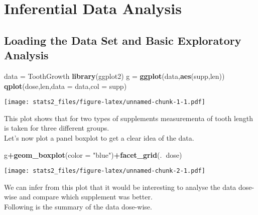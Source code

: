 \documentclass[
]{article}
\author{}
\date{\vspace{-2.5em}}
\newenvironment{Shaded}{\begin{snugshade}}{\end{snugshade}}
\newcommand{\ControlFlowTok}[1]{\textcolor[rgb]{0.13,0.29,0.53}{\textbf{#1}}}
\newcommand{\DataTypeTok}[1]{\textcolor[rgb]{0.13,0.29,0.53}{#1}}
\newcommand{\KeywordTok}[1]{\textcolor[rgb]{0.13,0.29,0.53}{\textbf{#1}}}
\newcommand{\NormalTok}[1]{#1}
\newcommand{\OperatorTok}[1]{\textcolor[rgb]{0.81,0.36,0.00}{\textbf{#1}}}
\newcommand{\StringTok}[1]{\textcolor[rgb]{0.31,0.60,0.02}{#1}}
\begin{document}
\hypertarget{inferential-data-analysis}{%
\section{Inferential Data Analysis}\label{inferential-data-analysis}}

\hypertarget{loading-the-data-set-and-basic-exploratory-analysis}{%
\subsection{Loading the Data Set and Basic Exploratory
Analysis}\label{loading-the-data-set-and-basic-exploratory-analysis}}

\begin{Shaded}
\begin{Highlighting}[]
\NormalTok{data =}\StringTok{ }\NormalTok{ToothGrowth}
\KeywordTok{library}\NormalTok{(ggplot2)}
\NormalTok{g =}\StringTok{ }\KeywordTok{ggplot}\NormalTok{(data,}\KeywordTok{aes}\NormalTok{(supp,len))}
\KeywordTok{qplot}\NormalTok{(dose,len,}\DataTypeTok{data =}\NormalTok{ data,}\DataTypeTok{col =}\NormalTok{ supp)}
\end{Highlighting}
\end{Shaded}

\texttt{[image: stats2\_files/figure-latex/unnamed-chunk-1-1.pdf]}

This plot shows that for two types of supplements measurementa of tooth
length is taken for three different groups.\\
Let's now plot a panel boxplot to get a clear idea of the data.

\begin{Shaded}
\begin{Highlighting}[]
\NormalTok{g}\OperatorTok{+}\KeywordTok{geom_boxplot}\NormalTok{(}\DataTypeTok{color =} \StringTok{"blue"}\NormalTok{)}\OperatorTok{+}\KeywordTok{facet_grid}\NormalTok{(.}\OperatorTok{~}\NormalTok{dose)}
\end{Highlighting}
\end{Shaded}

\texttt{[image: stats2\_files/figure-latex/unnamed-chunk-2-1.pdf]}

We can infer from this plot that it would be interesting to analyse the
data dose-wise and compare which supplement was better.\\
Following is the summary of the data dose-wise.

\begin{Shaded}
\end{Shaded}
\end{document}
